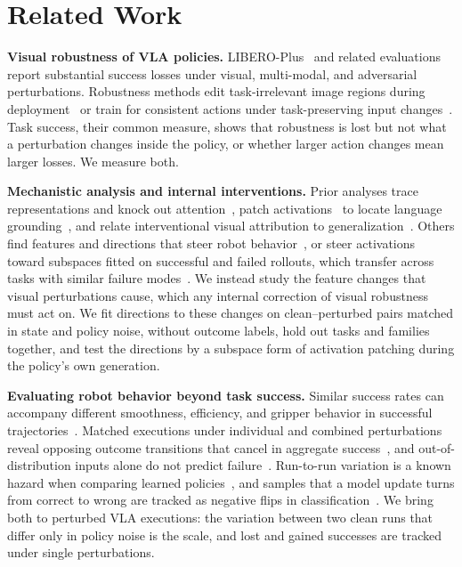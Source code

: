 \section{Related Work}\label{sec:related}
\textbf{Visual robustness of VLA policies.} LIBERO-Plus~\cite{fei2026liberoplus} and related evaluations~\cite{guo2026robustvla,wang2025adversarial} report substantial success losses under visual, multi-modal, and adversarial perturbations. Robustness methods edit task-irrelevant image regions during deployment~\cite{byovla} or train for consistent actions under task-preserving input changes~\cite{luo2026rovla,guo2026robustvla,peng2026pair}. Task success, their common measure, shows that robustness is lost but not what a perturbation changes inside the policy, or whether larger action changes mean larger losses. We measure both.

\textbf{Mechanistic analysis and internal interventions.} Prior analyses trace representations and knock out attention~\cite{vlatrace}, patch activations~\cite{meng2022locating} to locate language grounding~\cite{wulff2026language}, and relate interventional visual attribution to generalization~\cite{zhang2026embodied}. Others find features and directions that steer robot behavior~\cite{haon2025,sae,observing,grant2026}, or steer activations toward subspaces fitted on successful and failed rollouts, which transfer across tasks with similar failure modes~\cite{miao2026coast}. We instead study the feature changes that visual perturbations cause, which any internal correction of visual robustness must act on. We fit directions to these changes on clean--perturbed pairs matched in state and policy noise, without outcome labels, hold out tasks and families together, and test the directions by a subspace form of activation patching during the policy's own generation.

\textbf{Evaluating robot behavior beyond task success.} Similar success rates can accompany different smoothness, efficiency, and gripper behavior in successful trajectories~\cite{higham2026success}. Matched executions under individual and combined perturbations reveal opposing outcome transitions that cancel in aggregate success~\cite{sawada2026paired}, and out-of-distribution inputs alone do not predict failure~\cite{zhu2026vlascope}. Run-to-run variation is a known hazard when comparing learned policies~\cite{agarwal2021precipice}, and samples that a model update turns from correct to wrong are tracked as negative flips in classification~\cite{yan2021positive}. We bring both to perturbed VLA executions: the variation between two clean runs that differ only in policy noise is the scale, and lost and gained successes are tracked under single perturbations.
